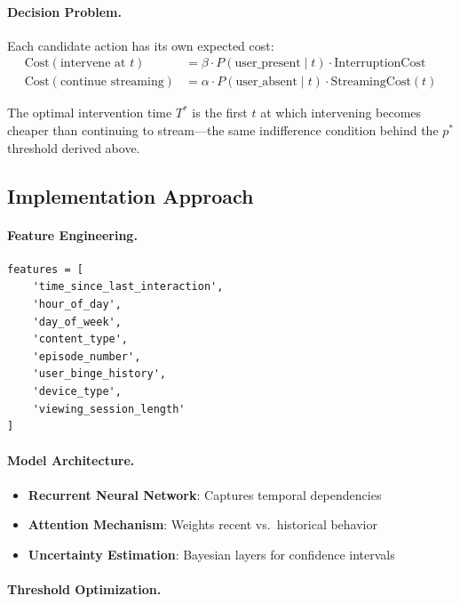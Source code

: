 \paragraph{Decision Problem.}

Each candidate action has its own expected cost:
\begin{align*}
\text{Cost}(\text{intervene at } t) &= \beta \cdot P(\text{user\_present} \mid t) \cdot \text{InterruptionCost} \\
\text{Cost}(\text{continue streaming}) &= \alpha \cdot P(\text{user\_absent} \mid t) \cdot \text{StreamingCost}(t)
\end{align*}

The optimal intervention time $T^*$ is the first $t$ at which intervening becomes cheaper than continuing to stream---the same indifference condition behind the $p^*$ threshold derived above.

\subsection{Implementation Approach}

\paragraph{Feature Engineering.}
\begin{lstlisting}[style=python, caption={Netflix engagement features}]
features = [
    'time_since_last_interaction',
    'hour_of_day',
    'day_of_week',
    'content_type',
    'episode_number',
    'user_binge_history',
    'device_type',
    'viewing_session_length'
]
\end{lstlisting}

\paragraph{Model Architecture.}
\begin{itemize}
    \item \textbf{Recurrent Neural Network}: Captures temporal dependencies
    \item \textbf{Attention Mechanism}: Weights recent vs.\ historical behavior
    \item \textbf{Uncertainty Estimation}: Bayesian layers for confidence intervals
\end{itemize}

\paragraph{Threshold Optimization.}

